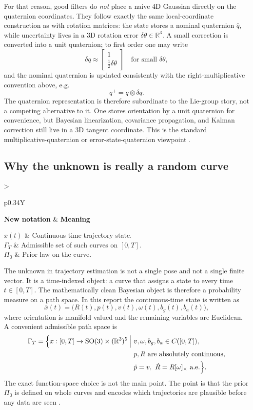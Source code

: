 \documentclass[11pt]{report}
\newcommand{\SO}{\mathrm{SO}(3)}
\newcommand{\R}{\mathbb{R}}
\newcommand{\Gspace}{\Gamma_T}
\newcommand{\Half}{\tfrac12}
\newcommand{\NotationTable}[1]{%
\vspace{0.6mm}
{\scriptsize
\setlength{\tabcolsep}{2.5pt}
\begin{tabularx}{\columnwidth}{>{\raggedright\arraybackslash}p{0.34\columnwidth}Y}
\toprule
\textbf{New notation} & \textbf{Meaning}\\
\midrule
#1\\
\bottomrule
\end{tabularx}}
\vspace{0.8mm}}
\begin{document}
For that reason, good filters do \emph{not} place a naive 4D Gaussian directly on the quaternion coordinates. They follow exactly the same local-coordinate construction as with rotation matrices: the state stores a nominal quaternion $\widehat q$, while uncertainty lives in a 3D rotation error $\delta\theta\in\R^3$. A small correction is converted into a unit quaternion; to first order one may write
\begin{equation}
\delta q \approx \begin{bmatrix}1\\ \Half\delta\theta\end{bmatrix}
\quad\text{for small }\delta\theta,
\end{equation}
and the nominal quaternion is updated consistently with the right-multiplicative convention above, e.g.
\begin{equation}
q^+ = q\otimes \delta q.
\label{eq:quat_update_sweep}
\end{equation}
The quaternion representation is therefore subordinate to the Lie-group story, not a competing alternative to it. One stores orientation by a unit quaternion for convenience, but Bayesian linearization, covariance propagation, and Kalman correction still live in a 3D tangent coordinate. This is the standard multiplicative-quaternion or error-state-quaternion viewpoint \citep{sola2017quaternion,sola2018micro}.

\subsection{Why the unknown is really a random curve}
\NotationTable{
$\bar x(t)$ & Continuous-time trajectory state.\\
$\Gspace$ & Admissible set of such curves on $[0,T]$.\\
$\Pi_0$ & Prior law on the curve.}

The unknown in trajectory estimation is not a single pose and not a single finite vector. It is a time-indexed object: a curve that assigns a state to every time $t\in[0,T]$. The mathematically clean Bayesian object is therefore a probability measure on a path space. In this report the continuous-time state is written as
\begin{equation}
\bar x(t)=\big(R(t),p(t),v(t),\omega(t),b_g(t),b_a(t)\big),
\end{equation}
where orientation is manifold-valued and the remaining variables are Euclidean. A convenient admissible path space is
\begin{equation}
\begin{aligned}
\Gspace=\Bigl\{\bar x:[0,T]\to \SO\times(\R^3)^5\;\Big|\;
&v,\omega,b_g,b_a\in C([0,T]),\\
&p,R\text{ are absolutely continuous},\\
&\dot p=v,\ \dot R=R[\omega]_{\times}\ \text{a.e.}\Bigr\}.
\end{aligned}
\end{equation}
The exact function-space choice is not the main point. The point is that the prior $\Pi_0$ is defined on whole curves and encodes which trajectories are plausible before any data are seen \citep{stuart2010inverse,hairer2007bayesian}.
\end{document}
